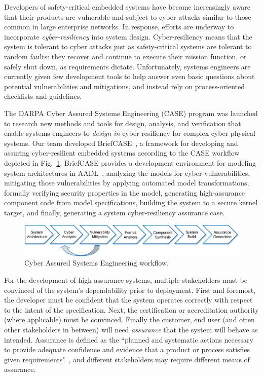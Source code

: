 
Developers of safety-critical embedded systems have become increasingly aware that their products are vulnerable and subject to cyber attacks similar to those common in large enterprise networks.  In response, efforts are underway to incorporate \textit{cyber-resiliency} into system design.  Cyber-resiliency means that the system is tolerant to cyber attacks just as safety-critical systems are tolerant to random faults: they recover and continue to execute their mission function, or safely shut down, as requirements dictate.  Unfortunately, systems engineers are currently given few development tools to help answer even basic questions about potential vulnerabilities and mitigations, and instead rely on process-oriented checklists and guidelines.

The DARPA Cyber Assured Systems Engineering (CASE) program was launched to research new methods and tools for design, analysis, and verification that enable systems engineers to \textit{design-in} cyber-resiliency for complex cyber-physical systems. 
%
Our team developed BriefCASE~\cite{case-at-scale}, a framework for developing and assuring cyber-resilient embedded systems according to the CASE workflow depicted in Fig.~\ref{fig:workflow}. BriefCASE provides a development environment for modeling system architectures in AADL~\cite{feiler-aadl}, analyzing the models for cyber-vulnerabilities, mitigating those vulnerabilities by applying automated model transformations, formally verifying security properties in the model, generating high-assurance component code from model specifications, building the system to a secure kernel target, and finally, generating a system cyber-resiliency assurance case.  

\begin{figure}[h] 
	\centering 
	\includegraphics[width=\textwidth]{figs/workflow.png}
	\caption{Cyber Assured Systems Engineering workflow.}
	\label{fig:workflow} 
\end{figure}

For the development of high-assurance systems, multiple stakeholders must be convinced of the system's dependability prior to deployment.  First and foremost, the developer must be confident that the system operates correctly with respect to the intent of the specification.  Next, the certification or accreditation authority (where applicable) must be convinced.  Finally the customer, end user (and often other stakeholders in between) will need \textit{assurance} that the system will behave as intended.  
Assurance is defined as the ``planned and systematic actions necessary to provide adequate confidence and evidence that a product or process satisfies given requirements"~\cite{do-178c}, and different stakeholders may require different means of assurance.  

